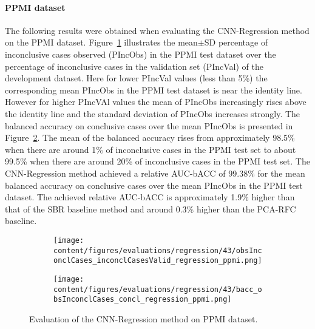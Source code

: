 
\paragraph{PPMI dataset}

The following results were obtained when evaluating the CNN-Regression method on the PPMI dataset.
Figure~\ref{fig:obsInconclCases_inconclCasesValid_regression_ppmi} illustrates the
mean$\pm$SD percentage of inconclusive cases observed (PIncObs) in the PPMI test dataset 
over the percentage of inconclusive cases in the validation set (PIncVal) of the development dataset.
Here for lower PIncVal values (less than 5\%) the corresponding mean PIncObs 
in the PPMI test dataset is near the identity line.
However for higher PIncVAl values the mean of PIncObs increasingly rises above the identity line
and the standard deviation of PIncObs increases strongly.
The balanced accuracy on conclusive cases over the mean PIncObs is presented in Figure~\ref{fig:bacc_obsInconclCases_concl_regression_ppmi}.
The mean of the balanced accuracy rises from approximately 98.5\% 
when there are around 1\% of inconclusive cases in the PPMI test set to about 99.5\% 
when there are around 20\% of inconclusive cases in the PPMI test set.
The CNN-Regression method achieved a relative AUC-bACC of 99.38\% for the mean balanced accuracy on conclusive cases 
over the mean PIncObs in the PPMI test dataset.
The achieved relative AUC-bACC is approximately 1.9\% higher than that of the SBR baseline method 
and around 0.3\% higher than the PCA-RFC baseline.


\begin{figure}[ht]
  \begin{subfigure}{0.49\textwidth}
    \centering
    \texttt{[image: content/figures/evaluations/regression/43/obsInconclCases\_inconclCasesValid\_regression\_ppmi.png]}
    \label{fig:obsInconclCases_inconclCasesValid_regression_ppmi}
  \end{subfigure}
  \hfill
  \begin{subfigure}{0.49\textwidth}
    \centering
    \texttt{[image: content/figures/evaluations/regression/43/bacc\_obsInconclCases\_concl\_regression\_ppmi.png]}
    \label{fig:bacc_obsInconclCases_concl_regression_ppmi}
  \end{subfigure}
  \caption{Evaluation of the CNN-Regression method on PPMI dataset.}
  \label{fig:perf_regression_ppmi}
\end{figure}



